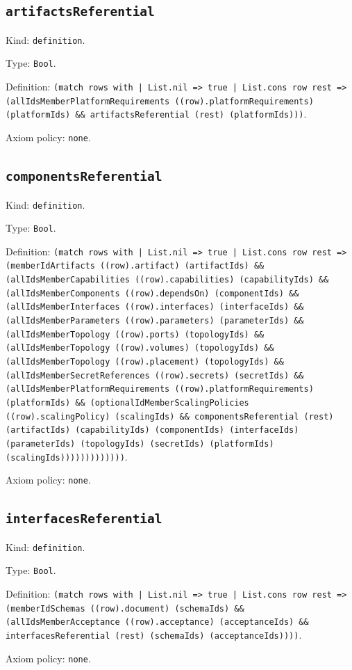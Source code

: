 \documentclass[11pt]{article}
\begin{document}
\subsection*{\texttt{artifactsReferential}}
\noindent Kind: \texttt{definition}.\par
\noindent Type: \texttt{Bool}.\par
\noindent Definition: \texttt{(match rows with | List.nil => true | List.cons row rest => (allIdsMemberPlatformRequirements ((row).platformRequirements) (platformIds) \&\& artifactsReferential (rest) (platformIds)))}.\par
\noindent Axiom policy: \texttt{none}.\par
\subsection*{\texttt{componentsReferential}}
\noindent Kind: \texttt{definition}.\par
\noindent Type: \texttt{Bool}.\par
\noindent Definition: \texttt{(match rows with | List.nil => true | List.cons row rest => (memberIdArtifacts ((row).artifact) (artifactIds) \&\& (allIdsMemberCapabilities ((row).capabilities) (capabilityIds) \&\& (allIdsMemberComponents ((row).dependsOn) (componentIds) \&\& (allIdsMemberInterfaces ((row).interfaces) (interfaceIds) \&\& (allIdsMemberParameters ((row).parameters) (parameterIds) \&\& (allIdsMemberTopology ((row).ports) (topologyIds) \&\& (allIdsMemberTopology ((row).volumes) (topologyIds) \&\& (allIdsMemberTopology ((row).placement) (topologyIds) \&\& (allIdsMemberSecretReferences ((row).secrets) (secretIds) \&\& (allIdsMemberPlatformRequirements ((row).platformRequirements) (platformIds) \&\& (optionalIdMemberScalingPolicies ((row).scalingPolicy) (scalingIds) \&\& componentsReferential (rest) (artifactIds) (capabilityIds) (componentIds) (interfaceIds) (parameterIds) (topologyIds) (secretIds) (platformIds) (scalingIds)))))))))))))}.\par
\noindent Axiom policy: \texttt{none}.\par
\subsection*{\texttt{interfacesReferential}}
\noindent Kind: \texttt{definition}.\par
\noindent Type: \texttt{Bool}.\par
\noindent Definition: \texttt{(match rows with | List.nil => true | List.cons row rest => (memberIdSchemas ((row).document) (schemaIds) \&\& (allIdsMemberAcceptance ((row).acceptance) (acceptanceIds) \&\& interfacesReferential (rest) (schemaIds) (acceptanceIds))))}.\par
\noindent Axiom policy: \texttt{none}.\par
\end{document}
